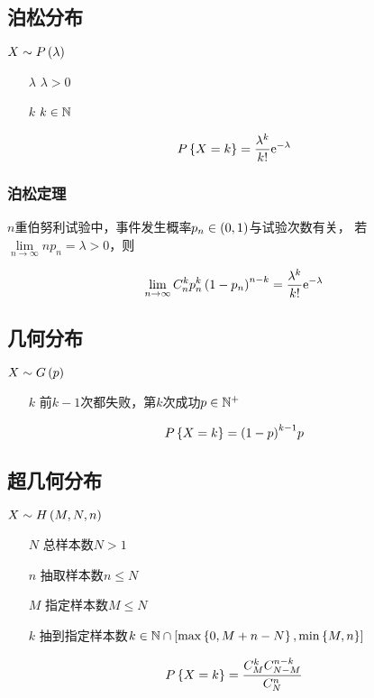 \documentclass{article}
\begin{document}
\subsection{泊松分布}

$X\sim P\left(\lambda\right)$

\begin{enumerate}
    \item [$\lambda$] $\lambda>0$
    \item [$k$] $k\in\mathbb N$
\end{enumerate}

\[P\left\{X=k\right\}=\frac{\lambda^k}{k!}\mathrm e^{-\lambda}\]

\subsubsection{泊松定理}

$n$重伯努利试验中，事件发生概率$p_n\in\left(0,1\right)$与试验次数有关，
若$\lim\limits_{n\to\infty}np_n=\lambda>0$，则

\[\lim_{n\to\infty}C_n^kp_n^k\left(1-p_n\right)^{n-k}
    =\dfrac{\lambda^k}{k!}\mathrm e^{-\lambda}\]

\subsection{几何分布}

$X\sim G\left(p\right)$

\begin{enumerate}
    \item [$k$] 前$k-1$次都失败，第$k$次成功$p\in\mathbb N^+$
\end{enumerate}

\[P\left\{X=k\right\}={\left(1-p\right)}^{k-1}p\]

\subsection{超几何分布}

$X\sim H\left(M,N,n\right)$

\begin{enumerate}
    \item [$N$] 总样本数$N>1$
    \item [$n$] 抽取样本数$n\leqslant N$
    \item [$M$] 指定样本数$M\leqslant N$
    \item [$k$] 抽到指定样本数$k\in\mathbb N\cap\left[\max\left\{0,M+n-N\right\},\min\left\{M,n\right\}\right]$
\end{enumerate}

\[P\left\{X=k\right\}=\frac{C_M^kC_{N-M}^{n-k}}{C_N^n}\]
\end{document}
